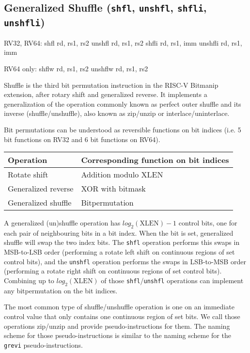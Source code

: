 \subsection{Generalized Shuffle (\texttt{shfl}, \texttt{unshfl}, \texttt{shfli}, \texttt{unshfli})}
\label{gzip}

\begin{rvb}
  RV32, RV64:
    shfl    rd, rs1, rs2
    unshfl  rd, rs1, rs2
    shfli   rd, rs1, imm
    unshfli rd, rs1, imm

  RV64 only:
    shflw    rd, rs1, rs2
    unshflw  rd, rs1, rs2
\end{rvb}

Shuffle is the third bit permutation instruction in the RISC-V Bitmanip
extension, after rotary shift and generalized reverse. It implements a
generalization of the operation commonly known as perfect outer shuffle and its
inverse (shuffle/unshuffle), also known as zip/unzip or interlace/uninterlace.

Bit permutations can be understood as reversible functions on bit indices (i.e.
5 bit functions on RV32 and 6 bit functions on RV64).

\begin{center}
\begin{tabular}{l l}
Operation & Corresponding function on bit indices \\
\hline
Rotate shift & Addition modulo {\rm XLEN} \\
Generalized reverse & XOR with bitmask \\
Generalized shuffle & Bitpermutation \\
\end{tabular}
\end{center}

A generalized (un)shuffle operation has $log_2(\textrm{XLEN})-1$ control bits,
one for each pair of neighbouring bits in a bit index. When the bit is set,
generalized shuffle will swap the two index bits. The {\tt shfl} operation
performs this swaps in MSB-to-LSB order (performing a rotate left shift on
continuous regions of set control bits), and the {\tt unshfl} operation performs
the swaps in LSB-to-MSB order (performing a rotate right shift on continuous
regions of set control bits). Combining up to $log_2(\textrm{XLEN})$ of those
{\tt shfl}/{\tt unshfl} operations can implement any bitpermutation on the
bit indices.

The most common type of shuffle/unshuffle operation is one on an immediate
control value that only contains one continuous region of set bits. We call
those operations zip/unzip and provide pseudo-instructions for them. The naming
scheme for those pseudo-instructions is similar to the naming scheme for the
{\tt grevi} pseudo-instructions.

